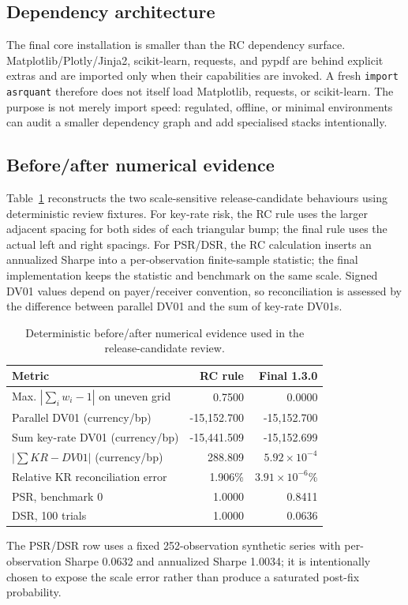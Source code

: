 \documentclass{asrpaper}
\begin{document}
\subsection{Dependency architecture}
The final core installation is smaller than the RC dependency surface. Matplotlib/Plotly/Jinja2, scikit-learn, requests, and pypdf are behind explicit extras and are imported only when their capabilities are invoked. A fresh \texttt{import asrquant} therefore does not itself load Matplotlib, requests, or scikit-learn. The purpose is not merely import speed: regulated, offline, or minimal environments can audit a smaller dependency graph and add specialised stacks intentionally.


\subsection{Before/after numerical evidence}
Table~\ref{tab:before-after} reconstructs the two scale-sensitive release-candidate behaviours using deterministic review fixtures. For key-rate risk, the RC rule uses the larger adjacent spacing for both sides of each triangular bump; the final rule uses the actual left and right spacings. For PSR/DSR, the RC calculation inserts an annualized Sharpe into a per-observation finite-sample statistic; the final implementation keeps the statistic and benchmark on the same scale. Signed DV01 values depend on payer/receiver convention, so reconciliation is assessed by the difference between parallel DV01 and the sum of key-rate DV01s.

\begin{table}[H]
\centering
\caption{Deterministic before/after numerical evidence used in the release-candidate review.}
\label{tab:before-after}
\scriptsize
\renewcommand{\arraystretch}{1.12}
\begin{tabularx}{\columnwidth}{@{}Xrr@{}}
\toprule
\textbf{Metric} & \textbf{RC rule} & \textbf{Final 1.3.0} \\
\midrule
Max. $|\sum_i w_i-1|$ on uneven grid & 0.7500 & 0.0000 \\
Parallel DV01 (currency/bp) & -15,152.700 & -15,152.700 \\
Sum key-rate DV01 (currency/bp) & -15,441.509 & -15,152.699 \\
$|\sum KR-DV01|$ (currency/bp) & 288.809 & $5.92\times10^{-4}$ \\
Relative KR reconciliation error & 1.906\% & $3.91\times10^{-6}$\% \\
PSR, benchmark 0 & 1.0000 & 0.8411 \\
DSR, 100 trials & 1.0000 & 0.0636 \\
\bottomrule
\end{tabularx}
\end{table}
The PSR/DSR row uses a fixed 252-observation synthetic series with per-observation Sharpe 0.0632 and annualized Sharpe 1.0034; it is intentionally chosen to expose the scale error rather than produce a saturated post-fix probability.
\end{document}
